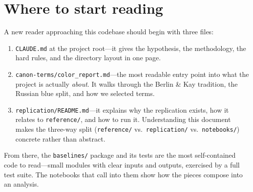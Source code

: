 \section{Where to start reading}
\label{sec:where-to-start}

A new reader approaching this codebase should begin with three files:

\begin{enumerate}
  \item \texttt{CLAUDE.md} at the project root---it gives the hypothesis, the methodology, the hard rules, and the directory layout in one page.
  \item \texttt{canon-terms/color\_report.md}---the most readable entry point into what the project is actually \emph{about}. It walks through the Berlin \& Kay tradition, the Russian blue split, and how we selected terms.
  \item \texttt{replication/README.md}---it explains why the replication exists, how it relates to \texttt{reference/}, and how to run it. Understanding this document makes the three-way split (\texttt{reference/} vs.\ \texttt{replication/} vs.\ \texttt{notebooks/}) concrete rather than abstract.
\end{enumerate}

From there, the \texttt{baselines/} package and its tests are the most self-contained code to read---small modules with clear inputs and outputs, exercised by a full test suite. The notebooks that call into them show how the pieces compose into an analysis.

